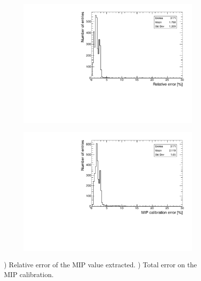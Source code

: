 \begin{figure}[htbp!]
	\begin{subfigure}[t]{0.5\textwidth}
		\centering
		\includegraphics[width=1\linewidth]{../Thesis_Plots/EnergyCalib/Plots/RelativeErrorMIP_Combined.pdf}
		\caption{} \label{fig:MIPError}
	\end{subfigure}
	\hfill
	\begin{subfigure}[t]{0.5\textwidth}
		\centering
		\includegraphics[width=1\linewidth]{../Thesis_Plots/EnergyCalib/Plots/FullMIPError_Combined.pdf}
		\caption{} \label{fig:FullError}
	\end{subfigure}
	\caption{) Relative error of the MIP value extracted. ) Total error on the MIP calibration.}
\end{figure}

